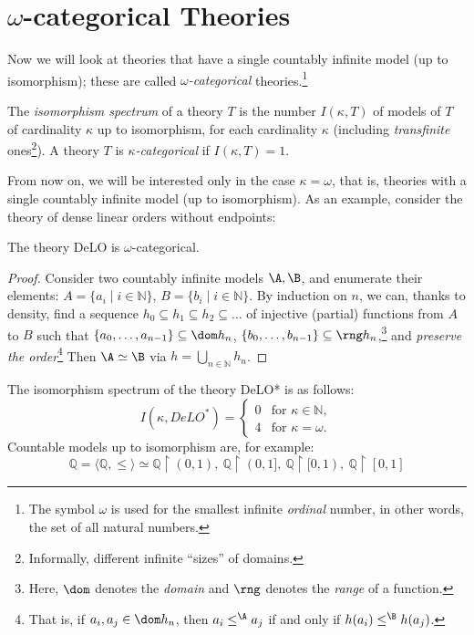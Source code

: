 \section{$\omega$-categorical Theories}\label{section:categoricity}

Now we will look at theories that have a single countably infinite model (up to isomorphism); these are called \emph{$\omega$-categorical} theories.\footnote{The symbol $\omega$ is used for the smallest infinite \emph{ordinal} number, in other words, the set of all natural numbers.}

\begin{definition}
    The \emph{isomorphism spectrum} of a theory $T$ is the number $
    I(\kappa,T)$ of models of $T$ of cardinality $\kappa$ up to isomorphism, for each cardinality $\kappa$ (including \emph{transfinite} ones\footnote{Informally, different infinite ``sizes'' of domains.}). A theory $T$ is \emph{$\kappa$-categorical} if $
    I(\kappa,T)=1$.
\end{definition}

From now on, we will be interested only in the case $\kappa=\omega$, that is, theories with a single countably infinite model (up to isomorphism). As an example, consider the theory of dense linear orders without endpoints:

\begin{proposition}
    The theory DeLO is $\omega$-categorical.
\end{proposition}
\begin{proof}
Consider two countably infinite models $\A, \B$, and enumerate their elements: $A=\{a_i \mid i\in \mathbb{N}\}$, $B=\{b_i \mid i\in \mathbb{N}\}$. By induction on $n$, we can, thanks to density, find a sequence $h_0 \subseteq h_1 \subseteq h_2 \subseteq \dots$ of injective (partial) functions from $A$ to $B$ such that $\{a_0, \dots, a_{n-1}\} \subseteq \dom h_n$, $\{b_0, \dots, b_{n-1}\} \subseteq \rng h_n$,\footnote{Here, $\dom$ denotes the \emph{domain} and $\rng$ denotes the \emph{range} of a function.} and \emph{preserve the order}\footnote{That is, if $a_i, a_j \in \dom h_n$, then $a_i \leq^\A a_j$ if and only if $h(a_i) \leq^\B h(a_j)$.} Then $\A \simeq \B$ via $h = \bigcup_{n\in \mathbb{N}} h_n$.
\end{proof}

\begin{corollary}
The isomorphism spectrum of the theory DeLO* is as follows:
$$
I(\kappa, DeLO^*)=\begin{cases}
    0 &\text{for } \kappa \in \mathbb{N},\\
    4 &\text{for } \kappa = \omega.
\end{cases}
$$
Countable models up to isomorphism are, for example:
$$ 
\mathbb{Q} = \langle \mathbb{Q}, \leq \rangle \simeq \mathbb{Q} \upharpoonright (0,1), \ \mathbb{Q} \upharpoonright (0,1], \ \mathbb{Q} \upharpoonright [0,1), \ \mathbb{Q} \upharpoonright [0,1]
$$
\end{corollary}

